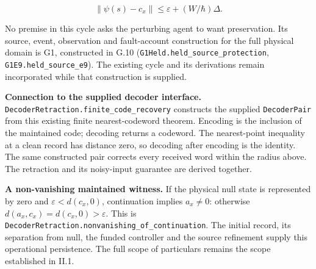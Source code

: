 \documentclass[
]{article}
\begin{document}
\[
\|\psi(s)-c_x\|\le\varepsilon+(W/\hbar)\Delta.
\]

No premise in this cycle asks the perturbing agent to want preservation.
Its source, event, observation and fault-account construction for the
full physical domain is G1, constructed in G.10
(\texttt{G\allowbreak{}1\allowbreak{}H\allowbreak{}e\allowbreak{}l\allowbreak{}d\allowbreak{}.\allowbreak{}h\allowbreak{}e\allowbreak{}l\allowbreak{}d\allowbreak{}\_\allowbreak{}s\allowbreak{}o\allowbreak{}u\allowbreak{}r\allowbreak{}c\allowbreak{}e\allowbreak{}\_\allowbreak{}p\allowbreak{}r\allowbreak{}o\allowbreak{}t\allowbreak{}e\allowbreak{}c\allowbreak{}t\allowbreak{}i\allowbreak{}o\allowbreak{}n},
\texttt{G\allowbreak{}1\allowbreak{}E\allowbreak{}9\allowbreak{}.\allowbreak{}h\allowbreak{}e\allowbreak{}l\allowbreak{}d\allowbreak{}\_\allowbreak{}s\allowbreak{}o\allowbreak{}u\allowbreak{}r\allowbreak{}c\allowbreak{}e\allowbreak{}\_\allowbreak{}e\allowbreak{}9}).
The existing cycle and its derivations remain incorporated while that
construction is supplied.

\textbf{Connection to the supplied decoder interface.}
\texttt{D\allowbreak{}e\allowbreak{}c\allowbreak{}o\allowbreak{}d\allowbreak{}e\allowbreak{}r\allowbreak{}R\allowbreak{}e\allowbreak{}t\allowbreak{}r\allowbreak{}a\allowbreak{}c\allowbreak{}t\allowbreak{}i\allowbreak{}o\allowbreak{}n\allowbreak{}.\allowbreak{}f\allowbreak{}i\allowbreak{}n\allowbreak{}i\allowbreak{}t\allowbreak{}e\allowbreak{}\_\allowbreak{}c\allowbreak{}o\allowbreak{}d\allowbreak{}e\allowbreak{}\_\allowbreak{}r\allowbreak{}e\allowbreak{}c\allowbreak{}o\allowbreak{}v\allowbreak{}e\allowbreak{}r\allowbreak{}y}
constructs the supplied \texttt{DecoderPair} from this existing finite
nearest-codeword theorem. Encoding is the inclusion of the maintained
code; decoding returns a codeword. The nearest-point inequality at a
clean record has distance zero, so decoding after encoding is the
identity. The same constructed pair corrects every received word within
the radius above. The retraction and its noisy-input guarantee are
derived together.

\textbf{A non-vanishing maintained witness.} If the physical null state
is represented by zero and \(\varepsilon<d(c_x,0)\), continuation
implies \(a_x\ne0\): otherwise \(d(a_x,c_x)=d(c_x,0)>\varepsilon\). This
is
\texttt{D\allowbreak{}e\allowbreak{}c\allowbreak{}o\allowbreak{}d\allowbreak{}e\allowbreak{}r\allowbreak{}R\allowbreak{}e\allowbreak{}t\allowbreak{}r\allowbreak{}a\allowbreak{}c\allowbreak{}t\allowbreak{}i\allowbreak{}o\allowbreak{}n\allowbreak{}.\allowbreak{}n\allowbreak{}o\allowbreak{}n\allowbreak{}v\allowbreak{}a\allowbreak{}n\allowbreak{}i\allowbreak{}s\allowbreak{}h\allowbreak{}i\allowbreak{}n\allowbreak{}g\allowbreak{}\_\allowbreak{}o\allowbreak{}f\allowbreak{}\_\allowbreak{}c\allowbreak{}o\allowbreak{}n\allowbreak{}t\allowbreak{}i\allowbreak{}n\allowbreak{}u\allowbreak{}a\allowbreak{}t\allowbreak{}i\allowbreak{}o\allowbreak{}n}.
The initial record, its separation from null, the funded controller and
the source refinement supply this operational persistence. The full
scope of particulars remains the scope established in II.1.
\end{document}
